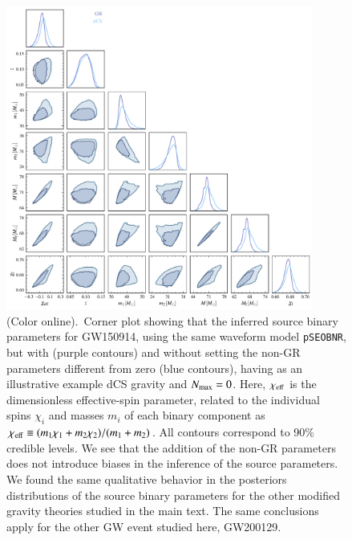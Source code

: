 \documentclass[twocolumn,
               prd,
               aps,
               superscriptaddress,
               tightenlines,
               nofootinbib,
               eqsecnum,
               amsfonts,
               amsmath,
               longbibliography]{revtex4-1}
\newcommand{\pSEOB}{\texttt{pSEOBNR}}
\newcommand{\hs}[1]{{\textcolor{TealBlue}{{#1}}}}
\begin{document}
\begin{figure}[t]
\includegraphics[width=0.9\textwidth]{figs/tmp_GW150914_intrinsic_params.pdf}
\caption{(Color online).~Corner plot showing that the inferred source binary parameters for GW150914,
using the same waveform model \pSEOB, but with (purple contours) and without setting the non-GR parameters different
from zero (blue contours), having as an illustrative example dCS gravity and $N_{\rm max}=0$.
%
Here, $\chi_{\rm eff}$ is the dimensionless effective-spin parameter, related to the individual spins $\chi_{i}$
and masses $m_{i}$ of each binary component as $\chi_{\rm eff} \equiv (m_1 \chi_1 + m_2 \chi_2) / (m_1 + m_2)$.
%
All contours correspond to 90\% credible levels.
%
We see that the addition of the non-GR parameters does not introduce biases in the
inference of the source parameters.
%
We found the same qualitative behavior in the posteriors distributions of the
source binary parameters for the other modified gravity theories studied in the
main text.
%
The same conclusions apply for the other GW event studied here, GW200129.
}
\label{fig:corner_plot_all}
\end{figure}

%
\end{document}
